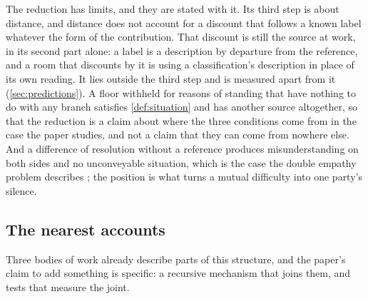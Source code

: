 The reduction has limits, and they are stated with it. Its third step is about distance, and distance does not account for a discount that follows a known label whatever the form of the contribution. That discount is still the source at work, in its second part alone: a label is a description by departure from the reference, and a room that discounts by it is using a classification's description in place of its own reading. It lies outside the third step and is measured apart from it (\autoref{sec:predictions}). A floor withheld for reasons of standing that have nothing to do with any branch satisfies \autoref{def:situation} and has another source altogether, so that the reduction is a claim about where the three conditions come from in the case the paper studies, and not a claim that they can come from nowhere else. And a difference of resolution without a reference produces misunderstanding on both sides and no unconveyable situation, which is the case the double empathy problem describes \cite{Milton2012}; the position is what turns a mutual difficulty into one party's silence.

\subsection{The nearest accounts}

Three bodies of work already describe parts of this structure, and the paper's claim to add something is specific: a recursive mechanism that joins them, and tests that measure the joint.

